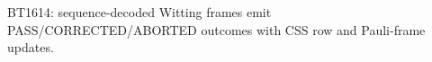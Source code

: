\begin{center}\small
BT1614: sequence-decoded Witting frames emit PASS/CORRECTED/ABORTED outcomes with CSS row and Pauli-frame updates.
\end{center}
